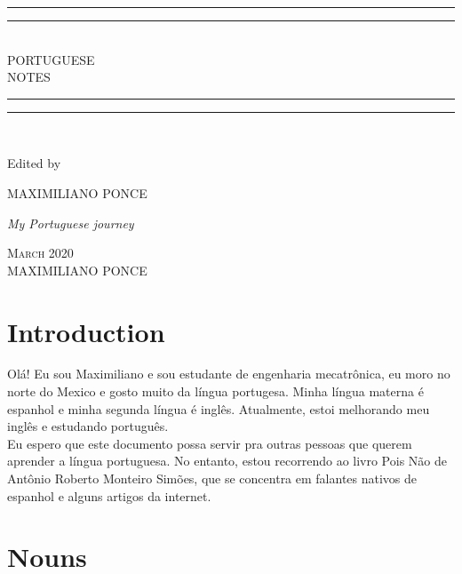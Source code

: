 \documentclass[10pt,a4paper]{article}
\newlength{\drop}
\begin{document}
\begin{titlepage}

\textheight
    \centering
    \vspace*{\baselineskip}
    \rule{\textwidth}{1.6pt}\vspace*{-\baselineskip}\vspace*{2pt}
    \rule{\textwidth}{0.6pt}\\[\baselineskip]
    {\LARGE PORTUGUESE\\[0.2\baselineskip] NOTES}\\[0.2\baselineskip]
    \rule{\textwidth}{0.4pt}\vspace*{-\baselineskip}\vspace{3.2pt}
    \rule{\textwidth}{1.6pt}\\[\baselineskip]
    \scshape

    \vspace*{2\baselineskip}
    Edited by \\[\baselineskip]
    {\Large MAXIMILIANO PONCE\par}
    {\itshape My Portuguese journey \\\par}
    \vfill
    {\scshape March 2020} \\
    {\large MAXIMILIANO PONCE}\par

\end{titlepage}

\tableofcontents
\newpage

\section{Introduction}
\indent
Olá! Eu sou Maximiliano e sou estudante de engenharia mecatrônica, eu moro no norte do Mexico e gosto muito da língua portugesa. Minha língua materna é espanhol e minha segunda língua é inglês. Atualmente, estoi melhorando meu inglês e estudando português. \\

\indent
Eu espero que este documento possa servir pra outras pessoas que querem aprender a língua portuguesa. No entanto, estou recorrendo ao livro Pois Não de Antônio Roberto Monteiro Simões, que se concentra em falantes nativos de espanhol e alguns artigos da internet.

\newpage
\section{Nouns}
\end{document}
